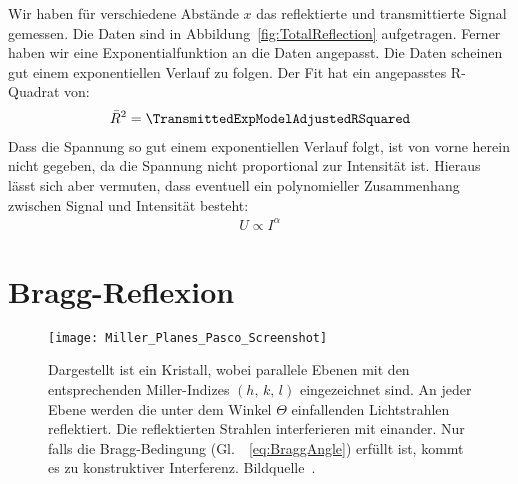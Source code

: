\documentclass[a4paper,10pt,twocolumn]{article}
\begin{document}
    Wir haben für verschiedene Abstände $x$ das reflektierte und transmittierte Signal gemessen.
    Die Daten sind in Abbildung~\ref{fig:TotalReflection} aufgetragen.
    Ferner haben wir eine Exponentialfunktion an die Daten angepasst.
    Die Daten scheinen gut einem exponentiellen Verlauf zu folgen.
    Der Fit hat ein angepasstes R-Quadrat von:
    \begin{align*}
        \bar{R}^2 = \TransmittedExpModelAdjustedRSquared
    \end{align*}
    Dass die Spannung so gut einem exponentiellen Verlauf folgt, ist von vorne herein nicht gegeben, da die
    Spannung nicht proportional zur Intensität ist.
    Hieraus lässt sich aber vermuten, dass eventuell ein polynomieller Zusammenhang zwischen
    Signal und Intensität besteht:
    \begin{align*}
        U \propto I^{\alpha}
    \end{align*}
    
    
    \section{Bragg-Reflexion}

    \begin{figure}[htbp]
        \centering
        \texttt{[image: Miller\_Planes\_Pasco\_Screenshot]}
        \caption{
            Dargestellt ist ein Kristall, wobei parallele Ebenen mit den entsprechenden 
            Miller-Indizes $(h,\,k,\,l)$ eingezeichnet sind.
            An jeder Ebene werden die unter dem Winkel $\Theta$ einfallenden Lichtstrahlen
            reflektiert.
            Die reflektierten Strahlen interferieren mit einander.
            Nur falls die Bragg-Bedingung (Gl.\ ~\eqref{eq:BraggAngle}) erfüllt ist, kommt es
            zu konstruktiver Interferenz.
            Bildquelle~\cite{pascoTeachersGuide}.
        }
        \label{fig:BraggPlanesIndices}
    \end{figure}
\end{document}
